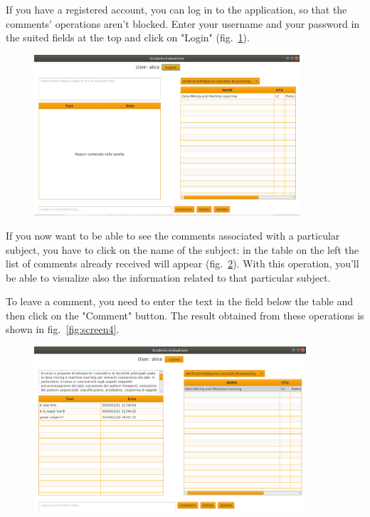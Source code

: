\documentclass[a4paper]{article}
\begin{document}
If you have a registered account, you can log in to the application, so that the comments' operations aren't blocked. Enter your username and your password in the suited fields at the top and click on "Login" (fig.~\ref{fig:screenLogin}).
\begin{figure}[h]
\centering
\includegraphics[width=0.88\textwidth]{images/screens/screenLogin}
\label{fig:screenLogin}
\end{figure}

If you now want to be able to see the comments associated with a particular subject, you have to click on the name of the subject: in the table on the left the list of comments already received will appear (fig.~\ref{fig:screen3}). With this operation, you'll be able to visualize also the information related to that particular subject.

To leave a comment, you need to enter the text in the field below the table and then click on the "Comment" button. The result obtained from these operations is shown in fig.~\ref{fig:screen4}.

\begin{figure}
\centering
\includegraphics[width=0.9\textwidth]{images/screens/screen3}
\label{fig:screen3}
\end{figure}
\end{document}
